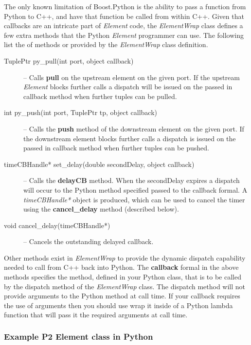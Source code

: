 \documentclass[12pt]{article}
\begin{document}
The only known limitation of Boost.Python is the ability to pass a function from
Python to C++, and have that function be called from within C++. Given that callbacks
are an intricate part of \emph{Element} code, the \emph{ElementWrap} class defines
a few extra methods that the Python \emph{Element} programmer can use. The
following list the of methods or provided by the \emph{ElementWrap} class definition.
\begin{description}
\item [TuplePtr py\_pull(int port, object callback)] -- Calls {\bf pull} on the upstream element on the given port. If the upstream \emph{Element} blocks further calls a dispatch will be issued on the passed in callback method when further tuples can be pulled.
\item [int py\_push(int port, TuplePtr tp, object callback)] -- Calls the {\bf push} method of the downstream element on the given port. If the downstream element blocks further calls a dispatch is issued on the passed in callback method when further tuples can be pushed.
\item [timeCBHandle* set\_delay(double secondDelay, object callback)] -- Calls the {\bf delayCB} method. When the secondDelay expires a dispatch will occur to the Python method specified passed to the callback formal. A \emph{timeCBHandle*} object is produced, which can be used to cancel the timer using the {\bf cancel\_delay} method (described below). 
\item [void cancel\_delay(timeCBHandle*)] -- Cancels the outstanding delayed callback.
\end{description}
Other methods exist in \emph{ElementWrap} to provide the dynamic dispatch 
capability needed to call from C++ back into Python. The {\bf callback} formal
in the above methods specifies the method, defined in your Python class, that
is to be called by the dispatch method of the \emph{ElementWrap} class. The dispatch
method will not provide arguments to the Python method at call time. If your callback
requires the use of arguments then you should use wrap it inside of a Python lambda function
that will pass it the required arguments at call time.

\subsubsection{Example P2 Element class in Python}
\label{sec:element_example}
\end{document}
